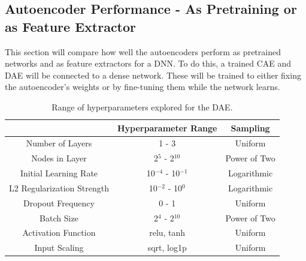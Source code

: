 \subsection{Autoencoder Performance - As Pretraining or as Feature Extractor}

This section will compare how well the autoencoders perform as pretrained networks and as feature extractors for a DNN. To do this, a trained CAE and DAE will be connected to a dense network. These will be trained to either fixing the autoencoder's weights or by fine-tuning them while the network learns.


\begin{table}[H]
\centering
\caption{Range of hyperparameters explored for the DAE.}
\label{table:hyperparameter_dataset_parameters_DAE}
\begin{tabular}{ccc}
 & Hyperparameter Range & Sampling \\ \hline
\multicolumn{1}{c}{Number of Layers} & 1 - 3 & Uniform \\ 
\multicolumn{1}{c}{Nodes in Layer} & 2$^{5}$ - 2$^{10}$ & Power of Two \\ 
\multicolumn{1}{c}{Initial Learning Rate} & 10$^{-4}$ - 10$^{-1}$ & Logarithmic \\ 
\multicolumn{1}{c}{L2 Regularization Strength} & 10$^{-2}$ - 10$^{0}$ & Logarithmic \\ 
\multicolumn{1}{c}{Dropout Frequency} & 0 - 1 & Uniform \\ 
\multicolumn{1}{c}{Batch Size} & 2$^{4}$ - 2$^{10}$ & Power of Two \\ 
\multicolumn{1}{c}{Activation Function} & relu, tanh & Uniform \\ 
\multicolumn{1}{c}{Input Scaling} & sqrt, log1p & Uniform \\ 
\end{tabular}
\end{table}











